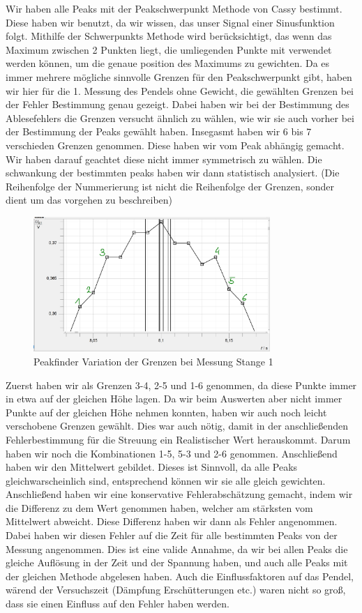 \documentclass[twoside]{protokoll}
\begin{document}
 
Wir haben alle Peaks mit der Peakschwerpunkt Methode von Cassy bestimmt.
Diese haben wir benutzt, da wir wissen, das unser Signal einer Sinusfunktion folgt.
Mithilfe der Schwerpunkts Methode wird berücksichtigt, das wenn das Maximum zwischen 2 Punkten liegt, die umliegenden Punkte mit verwendet werden können, um die genaue position des Maximums zu gewichten.
Da es immer mehrere mögliche sinnvolle Grenzen für den Peakschwerpunkt gibt, haben wir hier für die 1. Messung des Pendels ohne Gewicht, die gewählten Grenzen bei der Fehler Bestimmung genau gezeigt.
Dabei haben wir bei der Bestimmung des Ablesefehlers die Grenzen versucht ähnlich zu wählen, wie wir sie auch vorher bei der Bestimmung der Peaks gewählt haben.
Insegasmt haben wir 6 bis 7 verschieden Grenzen genommen. Diese haben wir vom Peak abhängig gemacht. Wir haben darauf geachtet diese nicht immer symmetrisch zu wählen.
Die schwankung der bestimmten peaks haben wir dann statistisch analysiert. 
(Die Reihenfolge der Nummerierung ist nicht die Reihenfolge der Grenzen, sonder dient um das vorgehen zu beschreiben)
\begin{figure}[H]
    \centering
    \includegraphics[width=0.8\textwidth]{plots/unsicherheit-bestimmen-stange1-punkte.pdf}
    \caption{Peakfinder Variation der Grenzen bei Messung Stange 1}     
\end{figure}
Zuerst haben wir als Grenzen 3-4, 2-5 und 1-6 genommen, da diese Punkte immer in etwa auf der gleichen Höhe lagen.
Da wir beim Auswerten aber nicht immer Punkte auf der gleichen Höhe nehmen konnten, haben wir auch noch leicht verschobene Grenzen gewählt.
Dies war auch nötig, damit in der anschließenden Fehlerbestimmung für die Streuung ein Realistischer Wert herauskommt.
Darum haben wir noch die Kombinationen 1-5, 5-3 und 2-6 genommen.
Anschließend haben wir den Mittelwert gebildet.
Dieses ist Sinnvoll, da alle Peaks gleichwarscheinlich sind, entsprechend können wir sie alle gleich gewichten.
Anschließend haben wir eine konservative Fehlerabschätzung gemacht, indem wir die Differenz zu dem Wert genommen haben, welcher am stärksten vom Mittelwert abweicht.
Diese Differenz haben wir dann als Fehler angenommen.
Dabei haben wir diesen Fehler auf die Zeit für alle bestimmten Peaks von der Messung angenommen.
Dies ist eine valide Annahme, da wir bei allen Peaks die gleiche Auflösung in der Zeit und der Spannung haben, und auch alle Peaks mit der gleichen Methode abgelesen haben.
Auch die Einflussfaktoren auf das Pendel, wärend der Versuchszeit (Dämpfung Erschütterungen etc.) waren nicht so groß, dass sie einen Einfluss auf den Fehler haben werden.
\end{document}
